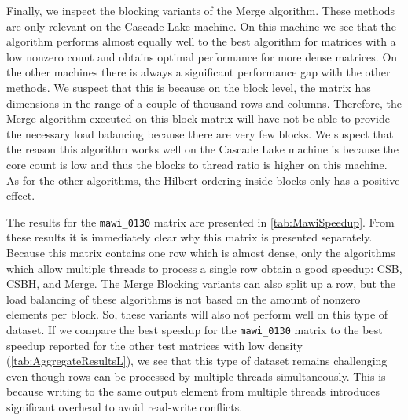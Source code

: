 \documentclass{siamart220329}
\begin{document}
Finally, we inspect the blocking variants of the Merge algorithm. These methods are only relevant on the Cascade Lake machine. On this machine we see that the algorithm performs almost equally well to the best algorithm for matrices with a low nonzero count and obtains optimal performance for more dense matrices. On the other machines there is always a significant performance gap with the other methods. We suspect that this is because on the block level, the matrix has dimensions in the range of a couple of thousand rows and columns. Therefore, the Merge algorithm executed on this block matrix will have not be able to provide the necessary load balancing because there are very few blocks. We suspect that the reason this algorithm works well on the Cascade Lake machine is because the core count is low and thus the blocks to thread ratio is higher on this machine. As for the other algorithms, the Hilbert ordering inside blocks only has a positive effect.

The results for the \texttt{mawi\_0130} matrix are presented in \cref{tab:MawiSpeedup}. From these results it is immediately clear why this matrix is presented separately. Because this matrix contains one row which is almost dense, only the algorithms which allow multiple threads to process a single row obtain a good speedup: CSB, CSBH, and Merge. The Merge Blocking variants can also split up a row, but the load balancing of these algorithms is not based on the amount of nonzero elements per block. So, these variants will also not perform well on this type of dataset. If we compare the best speedup for the \texttt{mawi\_0130} matrix to the best speedup reported for the other test matrices with low density (\cref{tab:AggregateResultsL}), we see that this type of dataset remains challenging even though rows can be processed by multiple threads simultaneously. This is because writing to the same output element from multiple threads introduces significant overhead to avoid read-write conflicts.


\end{document}

